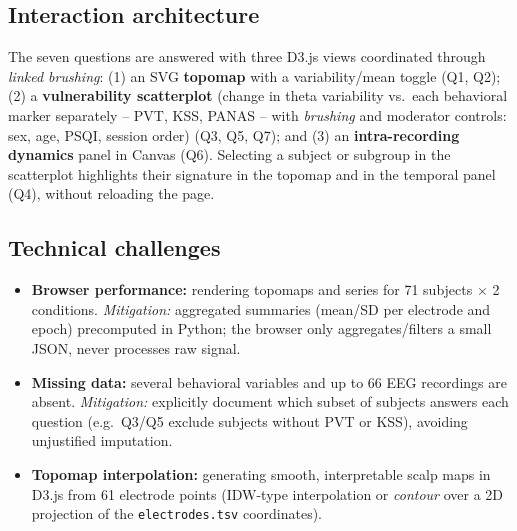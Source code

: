 \documentclass[10pt]{article}
\begin{document}
\subsection*{Interaction architecture}
The seven questions are answered with three D3.js views coordinated through \emph{linked brushing}: (1) an SVG \textbf{topomap} with a variability/mean toggle (Q1, Q2); (2) a \textbf{vulnerability scatterplot} (change in theta variability vs.\ each behavioral marker separately -- PVT, KSS, PANAS -- with \emph{brushing} and moderator controls: sex, age, PSQI, session order) (Q3, Q5, Q7); and (3) an \textbf{intra-recording dynamics} panel in Canvas (Q6). Selecting a subject or subgroup in the scatterplot highlights their signature in the topomap and in the temporal panel (Q4), without reloading the page.

\subsection*{Technical challenges}
\begin{itemize}
    \item \textbf{Browser performance:} rendering topomaps and series for 71 subjects $\times$ 2 conditions. \emph{Mitigation:} aggregated summaries (mean/SD per electrode and epoch) precomputed in Python; the browser only aggregates/filters a small JSON, never processes raw signal.
    \item \textbf{Missing data:} several behavioral variables and up to 66 EEG recordings are absent. \emph{Mitigation:} explicitly document which subset of subjects answers each question (e.g.\ Q3/Q5 exclude subjects without PVT or KSS), avoiding unjustified imputation.
    \item \textbf{Topomap interpolation:} generating smooth, interpretable scalp maps in D3.js from 61 electrode points (IDW-type interpolation or \emph{contour} over a 2D projection of the \texttt{electrodes.tsv} coordinates).
\end{itemize}
\end{document}

